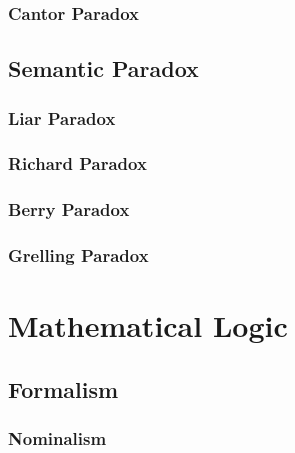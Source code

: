 \subsubsection{Cantor Paradox}\label{sec:cantor_paradox}



\subsection{Semantic Paradox}\label{sec:semantic_paradox}

\subsubsection{Liar Paradox}\label{sec:liar_paradox}

\subsubsection{Richard Paradox}\label{sec:richard_paradox}

\subsubsection{Berry Paradox}\label{sec:berry_paradox}

\subsubsection{Grelling Paradox}\label{sec:grelling_paradox}



\section{Mathematical Logic}\label{sec:mathematical_logic}
\cite{curry77}

\subsection{Formalism}\label{sec:formalism}

\subsubsection{Nominalism}\label{sec:nominalism}

